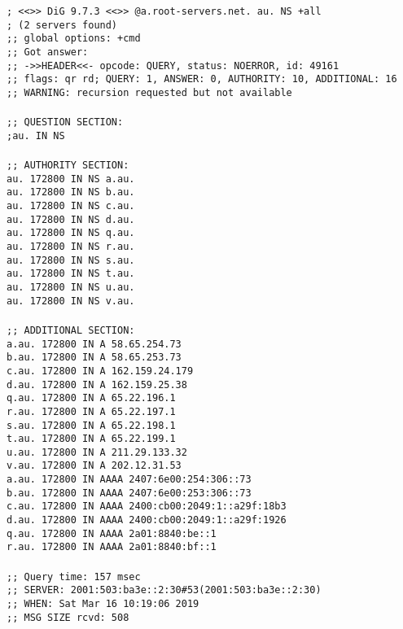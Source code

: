 \documentclass[a4paper,11pt]{article}
\newcommand{\code}{\texttt}
\begin{document}
\begin{enumerate}[leftmargin=*]
	\code{; <<>> DiG 9.7.3 <<>> @a.root-servers.net. au. NS +all\\
	; (2 servers found)\\
	;; global options: +cmd\\
	;; Got answer:\\
	;; ->>HEADER<<- opcode: QUERY, status: NOERROR, id: 49161\\
	;; flags: qr rd; QUERY: 1, ANSWER: 0, AUTHORITY: 10, ADDITIONAL: 16\\
	;; WARNING: recursion requested but not available\\
	\\
	;; QUESTION SECTION:\\
	;au.				IN	NS\\
	\\
	;; AUTHORITY SECTION:\\
	au.			172800	IN	NS	a.au.\\
	au.			172800	IN	NS	b.au.\\
	au.			172800	IN	NS	c.au.\\
	au.			172800	IN	NS	d.au.\\
	au.			172800	IN	NS	q.au.\\
	au.			172800	IN	NS	r.au.\\
	au.			172800	IN	NS	s.au.\\
	au.			172800	IN	NS	t.au.\\
	au.			172800	IN	NS	u.au.\\
	au.			172800	IN	NS	v.au.\\
	\\
	;; ADDITIONAL SECTION:\\
	a.au.			172800	IN	A	58.65.254.73\\
	b.au.			172800	IN	A	58.65.253.73\\
	c.au.			172800	IN	A	162.159.24.179\\
	d.au.			172800	IN	A	162.159.25.38\\
	q.au.			172800	IN	A	65.22.196.1\\
	r.au.			172800	IN	A	65.22.197.1\\
	s.au.			172800	IN	A	65.22.198.1\\
	t.au.			172800	IN	A	65.22.199.1\\
	u.au.			172800	IN	A	211.29.133.32\\
	v.au.			172800	IN	A	202.12.31.53\\
	a.au.			172800	IN	AAAA	2407:6e00:254:306::73\\
	b.au.			172800	IN	AAAA	2407:6e00:253:306::73\\
	c.au.			172800	IN	AAAA	2400:cb00:2049:1::a29f:18b3\\
	d.au.			172800	IN	AAAA	2400:cb00:2049:1::a29f:1926\\
	q.au.			172800	IN	AAAA	2a01:8840:be::1\\
	r.au.			172800	IN	AAAA	2a01:8840:bf::1\\
	\\
	;; Query time: 157 msec\\
	;; SERVER: 2001:503:ba3e::2:30\#53(2001:503:ba3e::2:30)\\
	;; WHEN: Sat Mar 16 10:19:06 2019\\
	;; MSG SIZE  rcvd: 508\\}


\end{enumerate}
\end{document}
